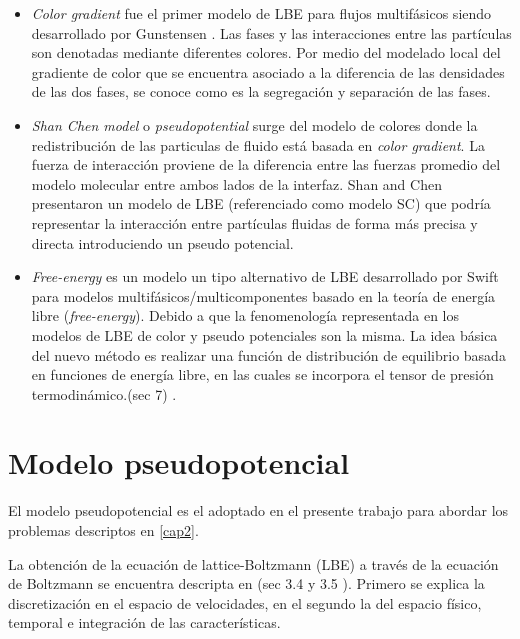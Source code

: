 \begin{itemize}
	
	\item \textit{Color gradient} fue el primer modelo de LBE para flujos multifásicos siendo desarrollado por Gunstensen \cite{gunstensen1991lattice}. Las fases y las interacciones entre las partículas son denotadas mediante diferentes colores. Por medio del modelado local del gradiente de color que se encuentra asociado a la diferencia de las densidades de las dos fases, se conoce como es la segregación y separación de las fases.
	
	\item \textit{Shan Chen model} o \textit{pseudopotential} surge del modelo de colores donde la redistribución de las particulas de fluido está basada en \textit{color gradient}. La fuerza de interacción proviene de la diferencia entre las fuerzas promedio del modelo molecular  entre ambos lados de la interfaz. Shan and Chen \cite{shan1993lattice} presentaron un modelo de LBE (referenciado como modelo SC) que podría representar la interacción entre partículas fluidas de forma más precisa y directa introduciendo un pseudo potencial. 
	
	\item \textit{Free-energy} es un modelo un tipo alternativo de LBE desarrollado por Swift \cite{swift1995lattice} para modelos multifásicos/multicomponentes basado en la teoría de energía libre (\textit{free-energy}). Debido a que la fenomenología representada en los modelos de LBE de color y pseudo potenciales son la misma. La idea básica del nuevo método es realizar una función de distribución de equilibrio basada en funciones de energía libre, en las cuales se incorpora el tensor de presión termodinámico.\cite{guo2013lattice}(sec 7) .
	
\end{itemize}


\section{Modelo pseudopotencial}

El modelo pseudopotencial es el adoptado en el presente trabajo para abordar los problemas descriptos en \ref{cap2}.


La obtención de la ecuación de lattice-Boltzmann (LBE) a través de la ecuación de Boltzmann se encuentra descripta en \cite{kruger2017lattice} (sec 3.4 y 3.5 ). Primero se explica la discretización en el espacio de velocidades, en el segundo la del espacio físico, temporal e integración de las características.



